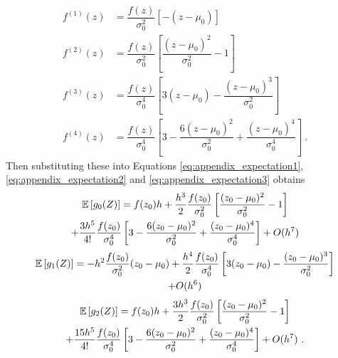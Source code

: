 \begin{align}
f^{(1)}(z) &= \dfrac{f(z)}{\sigma_0^2}\left[-(z-\mu_0)\right]
\\
f^{(2)}(z)&=\dfrac{f(z)}{\sigma_0^2}\left[
  \dfrac{(z-\mu_0)^2}{\sigma_0^2}-1
\right]
\\
f^{(3)}(z) &= \dfrac{f(z)}{\sigma_0^4}
\left[
3(z-\mu_0)-\dfrac{(z-\mu_0)^3}{\sigma_0^2}
\right]
\\
f^{(4)}(z) &= \dfrac{f(z)}{\sigma_0^4}
\left[
  3 - \dfrac{6(z-\mu_0)^2}{\sigma_0^2} + \dfrac{(z-\mu_0)^4}{\sigma_0^4}
\right] \ .
\end{align}
Then substituting these into Equations \eqref{eq:appendix_expectation1}, \eqref{eq:appendix_expectation2} and \eqref{eq:appendix_expectation3} obtains
\begin{multline}
\operatorname{\mathbb{E}}\left[g_0(Z)\right]
=
f(z_0)h
+
\dfrac{h^3}{2} \dfrac{f(z_0)}{\sigma_0^2}\left[
  \dfrac{(z_0-\mu_0)^2}{\sigma_0^2}-1
\right]
\\ +
\dfrac{3h^5}{4!} \dfrac{f(z_0)}{\sigma_0^4}
\left[
  3 - \dfrac{6(z_0-\mu_0)^2}{\sigma_0^2} + \dfrac{(z_0-\mu_0)^4}{\sigma_0^4}
\right]
+O(h^7)
\label{eq:appendix_expectationExpand1}
\end{multline}
\begin{multline}
\operatorname{\mathbb{E}}\left[g_1(Z)\right]
=
-h^2\dfrac{f(z_0)}{\sigma_0^2}(z_0-\mu_0)
+
\dfrac{h^4}{2} \dfrac{f(z_0)}{\sigma_0^4}
\left[
3(z_0-\mu_0)-\dfrac{(z_0-\mu_0)^3}{\sigma_0^2}
\right]
\\
+O(h^6)
\label{eq:appendix_expectationExpand2}
\end{multline}
\begin{multline}
\operatorname{\mathbb{E}}\left[g_2(Z)\right]
=
f(z_0)h
+
\dfrac{3h^3}{2} \dfrac{f(z_0)}{\sigma_0^2}\left[
  \dfrac{(z_0-\mu_0)^2}{\sigma_0^2}-1
\right]
\\ +
\dfrac{15h^5}{4!} \dfrac{f(z_0)}{\sigma_0^4}
\left[
  3 - \dfrac{6(z_0-\mu_0)^2}{\sigma_0^2} + \dfrac{(z_0-\mu_0)^4}{\sigma_0^4}
\right]
+O(h^7) \ .
\label{eq:appendix_expectationExpand3}
\end{multline}

